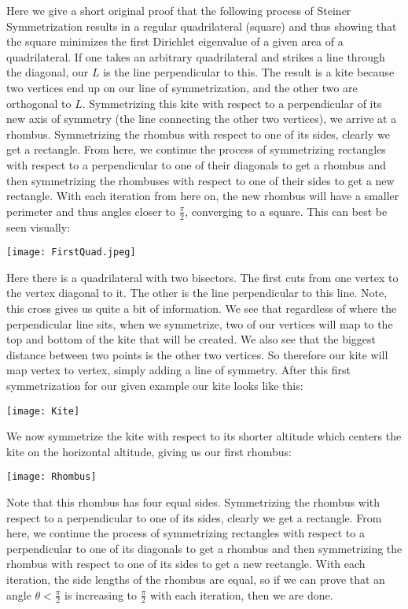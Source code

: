 \documentclass[12pt]{report}
\numberwithin{definition}{section}
\begin{document}
    Here we give a short original proof that the following process of Steiner Symmetrization results in a regular quadrilateral (square) and thus showing that the square minimizes the first Dirichlet eigenvalue of a given area of a quadrilateral. If one takes an arbitrary quadrilateral and strikes a line through the diagonal, our $L$ is the line perpendicular to this. The result is a kite because two vertices end up on our line of symmetrization, and the other two are orthogonal to $L$. Symmetrizing this kite with respect to a perpendicular of its new axis of symmetry (the line connecting the other two vertices), we arrive at a rhombus. Symmetrizing the rhombus with respect to one of its sides, clearly we get a rectangle. From here, we continue the process of symmetrizing rectangles with respect to a perpendicular to one of their diagonals to get a rhombus and then symmetrizing the rhombuses with respect to one of their sides to get a new rectangle. With each iteration from here on, the new rhombus will have a smaller perimeter and thus angles closer to $\frac{\pi}{2}$, converging to a square. This can best be seen visually:


\texttt{[image: FirstQuad.jpeg]}

Here there is a quadrilateral with two bisectors. The first cuts from one vertex to the vertex diagonal to it. The other is the line perpendicular to this line. Note, this cross gives us quite a bit of information. We see that regardless of where the perpendicular line sits, when we symmetrize, two of our vertices will map to the top and bottom of the kite that will be created. We also see that the biggest distance between two points is the other two vertices. So therefore our kite will map vertex to vertex, simply adding a line of symmetry. After this first symmetrization for our given example our kite looks like this: 

\texttt{[image: Kite]}

 We now symmetrize the kite with respect to its shorter altitude which centers the kite on the horizontal altitude, giving us our first rhombus:

\texttt{[image: Rhombus]}

Note that this rhombus has four equal sides. Symmetrizing the rhombus with respect to a perpendicular to one of its sides, clearly we get a rectangle. From here, we continue the process of symmetrizing rectangles with respect to a perpendicular to one of its diagonals to get a rhombus and then symmetrizing the rhombus with respect to one of its sides to get a new rectangle. With each iteration, the side lengths of the rhombus are equal, so if we can prove that an angle   $\theta < \frac{\pi}{2}$ is increasing to $\frac{\pi}{2}$ with each iteration, then we are done. 
	
\end{document}
